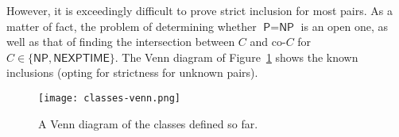 However, it is exceedingly difficult to prove strict inclusion for most pairs. As a matter of fact, the problem of determining whether \(\textsf{P} = \textsf{NP}\) is an open one, as well as that of finding the intersection between \(C\) and co-\(C\) for \(C\in\{\textsf{NP}, \textsf{NEXPTIME}\}\). The Venn diagram of Figure~\ref{fig:classes-venn} shows the known inclusions (opting for strictness for unknown pairs).


\begin{figure}
    \begin{center}
       \texttt{[image: classes-venn.png]}
    \end{center}
    \caption{A Venn diagram of the classes defined so far.}
    \label{fig:classes-venn}
\end{figure}

